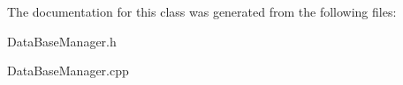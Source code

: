 The documentation for this class was generated from the following files\-:\begin{DoxyCompactItemize}
\item 
Data\-Base\-Manager.\-h\item 
Data\-Base\-Manager.\-cpp\end{DoxyCompactItemize}

